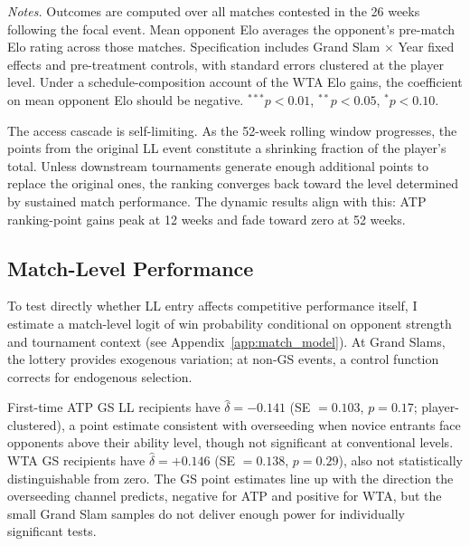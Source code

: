 \begin{table}[htbp]
\centering
\caption{Post-Event Schedule Composition and Performance}
\label{tab:schedule}
\begin{threeparttable}
\small

\begin{tablenotes}
\footnotesize
\item \textit{Notes.} Outcomes are computed over all matches contested in the 26 weeks following the focal event. Mean opponent Elo averages the opponent's pre-match Elo rating across those matches. Specification includes Grand Slam $\times$ Year fixed effects and pre-treatment controls, with standard errors clustered at the player level. Under a schedule-composition account of the WTA Elo gains, the coefficient on mean opponent Elo should be negative. $^{***}p<0.01$, $^{**}p<0.05$, $^{*}p<0.10$.
\end{tablenotes}
\end{threeparttable}
\end{table}

The access cascade is self-limiting. As the 52-week rolling window progresses, the points from the original LL event constitute a shrinking fraction of the player's total. Unless downstream tournaments generate enough additional points to replace the original ones, the ranking converges back toward the level determined by sustained match performance. The dynamic results align with this: ATP ranking-point gains peak at 12 weeks and fade toward zero at 52 weeks.

\subsection{Match-Level Performance}
\label{sec:mechanisms_performance}

To test directly whether LL entry affects competitive performance itself, I estimate a match-level logit of win probability conditional on opponent strength and tournament context (see Appendix~\ref{app:match_model}). At Grand Slams, the lottery provides exogenous variation; at non-GS events, a control function corrects for endogenous selection.

First-time ATP GS LL recipients have $\hat{\delta} = -0.141$ (SE $= 0.103$, $p = 0.17$; player-clustered), a point estimate consistent with overseeding when novice entrants face opponents above their ability level, though not significant at conventional levels. WTA GS recipients have $\hat{\delta} = +0.146$ (SE $= 0.138$, $p = 0.29$), also not statistically distinguishable from zero. The GS point estimates line up with the direction the overseeding channel predicts, negative for ATP and positive for WTA, but the small Grand Slam samples do not deliver enough power for individually significant tests.

